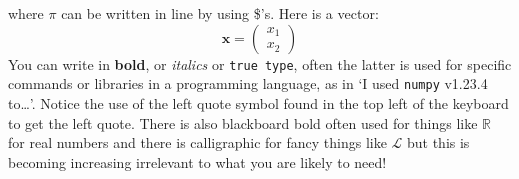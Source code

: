 \documentclass[12pt]{article}
\begin{document}
where $\pi$ can be written in line by using \$'s. Here is a vector:
\begin{equation}
\mathbf{x}=\left(\begin{array}{c}x_1\\x_2\end{array}\right)
\end{equation}
You can write in \textbf{bold}, or \textsl{italics} or \texttt{true
  type}, often the latter is used for specific commands or libraries in a
programming language, as in `I used \texttt{numpy} v1.23.4 to\ldots'. Notice the use of the left quote symbol found in the top left of the keyboard to get the left quote. There is also blackboard bold often used for things like $\mathbb{R}$ for real numbers and there is calligraphic for fancy things like $\mathcal{L}$ but this is becoming increasing irrelevant to what you are likely to need! 
\end{document}
